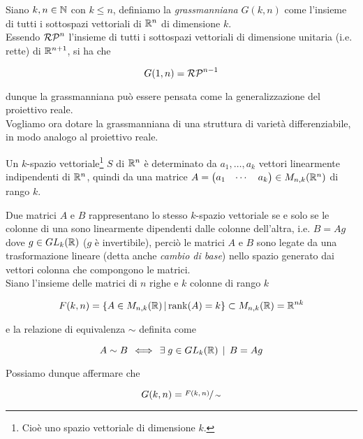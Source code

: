 Siano $ k,n \in \mathbb{N} $ con $ k \leqslant n $, definiamo la \textit{grassmanniana} $ G(k,n) $ come l'insieme di tutti i sottospazi vettoriali di $ \mathbb{R}^{n} $ di dimensione $ k $.\\
Essendo $ \mathcal{RP}^{n} $ l'insieme di tutti i sottospazi vettoriali di dimensione unitaria (i.e. rette) di $ \mathbb{R}^{n+1} $, si ha che

\begin{equation}
	G(1,n) = \mathcal{RP}^{n-1}
\end{equation}

dunque la grassmanniana può essere pensata come la generalizzazione del proiettivo reale.\\
Vogliamo ora dotare la grassmanniana di una struttura di varietà differenziabile, in modo analogo al proiettivo reale.

\begin{remark}
	Un $ k $-spazio vettoriale\footnote{%
		Cioè uno spazio vettoriale di dimensione $ k $.%
	} $ S $ di $ \mathbb{R}^{n} $ è determinato da $ a_{1},\dots,a_{k} $ vettori linearmente indipendenti di $ \mathbb{R}^{n} $, quindi da una matrice $ A = \pmqty{ a_{1} & \cdots & a_{k} } \in M_{n,k}(\R^{n}) $ di rango $ k $.
\end{remark}

Due matrici $ A $ e $ B $ rappresentano lo stesso $ k $-spazio vettoriale se e solo se le colonne di una sono linearmente dipendenti dalle colonne dell'altra, i.e. $ B = A g $ dove $ g \in GL_{k}(\mathbb{R}) $ ($ g $ è invertibile), perciò le matrici $ A $ e $ B $ sono legate da una trasformazione lineare (detta anche \textit{cambio di base}) nello spazio generato dai vettori colonna che compongono le matrici.\\
Siano l'insieme delle matrici di $ n $ righe e $ k $ colonne di rango $ k $

\begin{equation}
	F(k,n) = \left\{ A \in M_{n,k}(\mathbb{R}) \, \middle| \, \rank(A) = k \right\} \subset M_{n,k}(\mathbb{R}) = \mathbb{R}^{nk}
\end{equation}

e la relazione di equivalenza $ \sim $ definita come

\begin{equation}
	A \sim B \, \iff \, \exists \; g \in GL_{k}(\mathbb{R}) \, \mid \, B = A g
\end{equation}

Possiamo dunque affermare che

\begin{equation}
	G(k,n) = \sfrac{F(k,n)}{\sim}
\end{equation}

